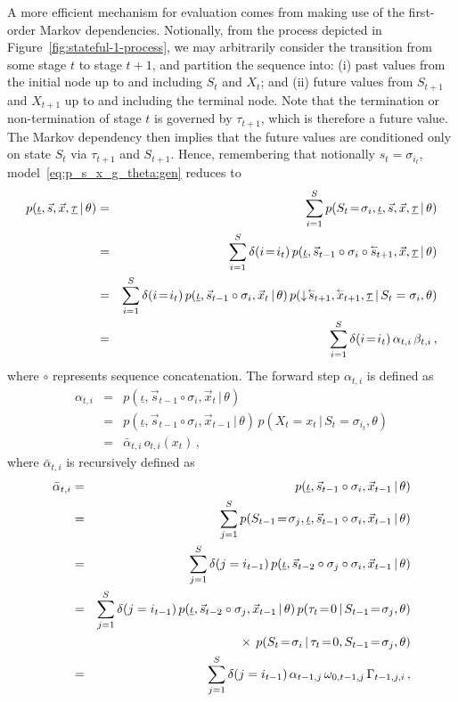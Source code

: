 \documentclass[a4paper]{article}
\newcommand{\rvec}[1]{\accentset{\leftarrow}{#1}}
\newcommand{\dn}{\downarrow\!}
\newcommand{\ui}{\underline{\iota}}
\newcommand{\ut}{\underline{\tau}}
\begin{document}
A more efficient mechanism for evaluation comes from making use of the first-order Markov dependencies.
Notionally, from the process depicted in Figure~\ref{fig:stateful-1-process}, we may arbitrarily consider the transition from 
some stage $t$ to stage $t+1$,
and partition the sequence into: (i) past values from the initial node up to and including $S_t$ and $X_t$;
and (ii) future values from $S_{t+1}$ and $X_{t+1}$ up to and including the terminal node.
Note that the termination or non-termination of stage $t$ is governed by $\tau_{t+1}$, which is
therefore a future value.
The Markov dependency then implies that the future values are conditioned only on state $S_t$
via $\tau_{t+1}$ and $S_{t+1}$.
Hence, remembering that notionally $s_t=\sigma_{i_t}$, model~\eqref{eq:p_s_x_g_theta:gen} reduces to
\begin{eqnarray}
   p(\ui,\vec{s},\vec{x},\ut\,|\,\theta) 
& = &
   \sum_{i=1}^{S}p(S_t\!=\!\sigma_{i},\ui,\vec{s},\vec{x},\ut\,|\,\theta) 
\nonumber\\& = & 
   \sum_{i=1}^{S}\delta(i\!=\!i_t)\,p(\ui,\vec{s}_{t-1}\circ\sigma_{i}\circ\rvec{s}_{t+1},\vec{x},\ut\,|\,\theta) 
\nonumber\\& = & 
   \sum_{i=1}^{S}\delta(i\!=\!i_t)\,p(\ui,\vec{s}_{t-1}\circ\sigma_{i},\vec{x}_t\,|\,\theta) 
\,p(\dn\rvec{s}_{t+1},\rvec{x}_{t+1},\ut\,|\,S_t=\sigma_{i},\theta) 
\nonumber\\& = &
  \sum_{i=1}^{S}\delta(i\!=\!i_t)\,\alpha_{t,i}\,\beta_{t,i}\,,
\label{eq:forward-backward}
\end{eqnarray}
where $\circ$ represents sequence concatenation.
The forward step $\alpha_{t,i}$ is defined as
\begin{eqnarray}
   \alpha_{t,i} & = & p(\ui,\vec{s}_{t-1}\circ\sigma_{i},\vec{x}_t\,|\,\theta) 
\nonumber\\& = &
   p(\ui,\vec{s}_{t-1}\circ\sigma_{i},\vec{x}_{t-1}\,|\,\theta) \,p(X_t\!=\!x_t\,|\,S_t\!=\!\sigma_{i_t},\theta)
\nonumber\\& = &
   \bar{\alpha}_{t,i}\,o_{t,i}(x_t)\,,
\label{eq:alpha}
\end{eqnarray}
where $\bar{\alpha}_{t,i}$ is recursively defined as
\begin{eqnarray}
   \bar{\alpha}_{t,i} & = & p(\ui,\vec{s}_{t-1}\circ\sigma_{i},\vec{x}_{t-1}\,|\,\theta) 
\nonumber\\& = &
   \sum_{j=1}^{S}p(S_{t-1}\!=\!\sigma_j,\ui,\vec{s}_{t-1}\circ\sigma_{i},\vec{x}_{t-1}\,|\,\theta) 
\nonumber\\& = &
   \sum_{j=1}^{S}\delta(j=i_{t-1})\,p(\ui,\vec{s}_{t-2}\circ\sigma_{j}\circ\sigma_{i},\vec{x}_{t-1}\,|\,\theta) 
\nonumber\\& = &
   \sum_{j=1}^{S}\delta(j=i_{t-1})\,p(\ui,\vec{s}_{t-2}\circ\sigma_{j},\vec{x}_{t-1}\,|\,\theta) 
      \,p(\tau_t\!=\!0\,|\,S_{t-1}\!=\!\sigma_j,\theta)
\nonumber\\&&
    \hspace*{5mm}{}\times\,p(S_t\!=\!\sigma_i\,|\,\tau_{t}\!=\!0,S_{t-1}\!=\!\sigma_j,\theta)
\nonumber\\& = &
   \sum_{j=1}^{S}\delta(j=i_{t-1})\,\alpha_{t-1,j}\,\omega_{0,t-1,j}\,\Gamma_{t-1,j,i}\,,
\label{eq:alpha-bar}
\end{eqnarray}
\end{document}
